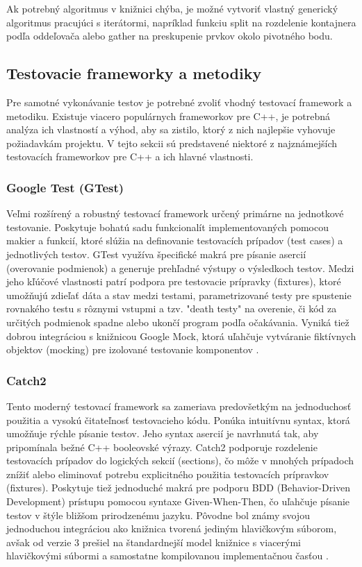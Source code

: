 \documentclass[11pt]{article}
\begin{document}
Ak potrebný algoritmus v knižnici chýba, je možné vytvoriť vlastný generický algoritmus pracujúci s iterátormi, napríklad funkciu split na rozdelenie kontajnera podľa oddeľovača alebo gather na preskupenie prvkov okolo pivotného bodu.

\subsection{Testovacie frameworky a metodiky}

Pre samotné vykonávanie testov je potrebné zvoliť vhodný testovací framework a metodiku. Existuje viacero populárnych frameworkov pre C++, je potrebná analýza ich vlastností a výhod, aby sa zistilo, ktorý z nich najlepšie vyhovuje požiadavkám projektu. V tejto sekcii sú predstavené niektoré z najznámejších testovacích frameworkov pre C++ a ich hlavné vlastnosti.

\subsubsection{Google Test (GTest)}
Veľmi rozšírený a robustný testovací framework určený primárne na jednotkové testovanie. Poskytuje bohatú sadu funkcionalít implementovaných pomocou makier a funkcií, ktoré slúžia na definovanie testovacích prípadov (test cases) a jednotlivých testov. GTest využíva špecifické makrá pre písanie asercií (overovanie podmienok) a generuje prehľadné výstupy o výsledkoch testov. Medzi jeho kľúčové vlastnosti patrí podpora pre testovacie prípravky (fixtures), ktoré umožňujú zdieľať dáta a stav medzi testami, parametrizované testy pre spustenie rovnakého testu s rôznymi vstupmi a tzv. "death testy" na overenie, či kód za určitých podmienok spadne alebo ukončí program podľa očakávania. Vyniká tiež dobrou integráciou s knižnicou Google Mock, ktorá uľahčuje vytváranie fiktívnych objektov (mocking) pre izolované testovanie komponentov \cite{github_googletest}.

\subsubsection{Catch2}
Tento moderný testovací framework sa zameriava predovšetkým na jednoduchosť použitia a vysokú čitateľnosť testovacieho kódu. Ponúka intuitívnu syntax, ktorá umožňuje rýchle písanie testov. Jeho syntax asercií je navrhnutá tak, aby pripomínala bežné C++ booleovské výrazy. Catch2 podporuje rozdelenie testovacích prípadov do logických sekcií (sections), čo môže v mnohých prípadoch znížiť alebo eliminovať potrebu explicitného použitia testovacích prípravkov (fixtures). Poskytuje tiež jednoduché makrá pre podporu BDD (Behavior-Driven Development) prístupu pomocou syntaxe Given-When-Then, čo uľahčuje písanie testov v štýle bližšom prirodzenému jazyku. Pôvodne bol známy svojou jednoduchou integráciou ako knižnica tvorená jediným hlavičkovým súborom, avšak od verzie 3 prešiel na štandardnejší model knižnice s viacerými hlavičkovými súbormi a samostatne kompilovanou implementačnou časťou \cite{github_catch2}.
\end{document}
